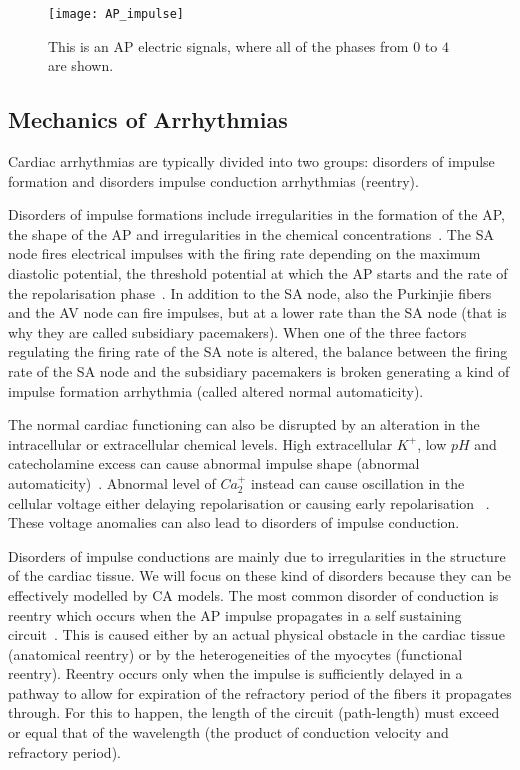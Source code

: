 \documentclass{article}
\begin{document}
 \begin{figure}[H]
\centering
\texttt{[image: AP\_impulse]}
\caption{This is an AP electric signals, where all of the phases from $0$ to $4$ are shown.~\cite{cardiacphys_ap2009} }
\label{AP_impulse}
\end{figure}

\subsection{Mechanics of Arrhythmias} 
 
  
 
Cardiac arrhythmias are typically divided into two groups: disorders of impulse formation and disorders impulse conduction arrhythmias (reentry). 

Disorders of impulse formations include irregularities in the formation of the AP, the shape of the AP and irregularities in the chemical concentrations~\cite{arrhythmia_review2012}. The SA node fires electrical impulses with the firing rate depending on the maximum diastolic potential, the threshold potential at which the AP starts and the rate of the repolarisation phase~\cite{cardiacphys_ap2009}. In addition to the SA node, also the Purkinjie fibers and the AV node can fire impulses, but at a lower rate than the SA node (that is why they are called subsidiary pacemakers). When one of the three factors regulating the firing rate of the SA note is altered, the balance between the firing rate of the SA node and the subsidiary pacemakers is broken generating a kind of impulse formation arrhythmia (called altered normal automaticity). 

The normal cardiac functioning can also be disrupted by an alteration in the intracellular or extracellular chemical levels. High extracellular $K^{+}$, low $pH$ and catecholamine excess can cause abnormal impulse shape (abnormal automaticity)~\cite{arrhythmia_review2012}. Abnormal level of $Ca_{2}^{+}$ instead can cause oscillation in the cellular voltage either delaying repolarisation or causing early repolarisation ~\cite{arrhythmia_careview2016}. These voltage anomalies can also lead to disorders of impulse conduction. 
 
 
Disorders of impulse conductions are mainly due to irregularities in the structure of the cardiac tissue. We will focus on these kind of disorders because they can be effectively modelled by CA models. The most common disorder of conduction is reentry which occurs when the AP impulse propagates in a self sustaining circuit~\cite{arrhythmia_review2001}.  
This is caused either by an actual physical obstacle in the cardiac tissue (anatomical reentry) or by the heterogeneities of the myocytes (functional reentry). Reentry occurs only when the impulse is sufficiently delayed in a pathway to allow for expiration of the refractory period of the fibers it propagates through. For this to happen, the length of the circuit (path-length) must exceed or equal that of the wavelength (the product of conduction velocity and refractory period). 
 
\end{document}
